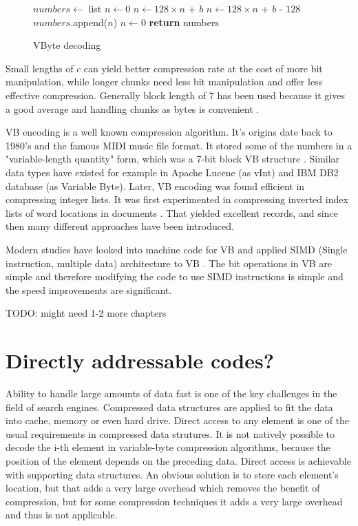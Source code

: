 \begin{figure}[ht]
\begin{algorithmic}
\State $numbers\gets $ list
\State $n\gets 0$
\State $n\gets 128\times n $ + $b$
\Else
\State $n\gets 128\times n $ + $b$ - $128$
\State $numbers$.append($n$)
\State $n\gets 0$
\EndIf
\EndFor
\State \textbf{return} numbers
\EndFunction
\end{algorithmic}
\caption{VByte decoding} \label{vbyte_dec}
\end{figure}

Small lengths of $c$ can yield better compression rate at the cost of more bit manipulation, while longer chunks need less bit manipulation and 
offer less effective compression. Generally block length of 7 has been used because it gives a good average and handling chunks as bytes is 
convenient \citep{Man08}.

VB encoding is a well known compression algorithm. It's origins date back to 1980's and the famous MIDI music file format. It stored some of the numbers
in a "variable-length quantity" form, which was a 7-bit block VB structure \citep{Mid96}. Similar data types have existed for example in Apache Lucene 
(as vInt) and IBM DB2 database (as Variable Byte). Later, VB encoding was found efficient in compressing integer lists. It was first experimented in 
compressing inverted index lists of word locations in documents \citep{Sch02}. That yielded excellent records, and since then many different approaches 
have been introduced. 

Modern studies have looked into machine code for VB and applied SIMD (Single instruction, multiple data) architecture to VB \citep{Lem18,Pla15}. The bit 
operations in VB are simple and therefore modifying the code to use SIMD instructions is simple and the speed improvements are significant. 

TODO: might need 1-2 more chapters


\chapter{Directly addressable codes?}

Ability to handle large amounts of data fast is one of the key challenges in the field of search engines. Compressed data structures are applied to fit the 
data into cache, memory or even hard drive. Direct access to any element is one of the usual requirements in compressed data strutures. It is not natively
possible to decode the i-th element in variable-byte compression algorithms, because the position of the element depends on the preceding data. Direct access 
is achievable with supporting data structures. An obvious solution is to store each element's location, but that adds a very large overhead which removes the 
benefit of compression, but for some compression techniques it adds a very large overhead and thus is not applicable.

